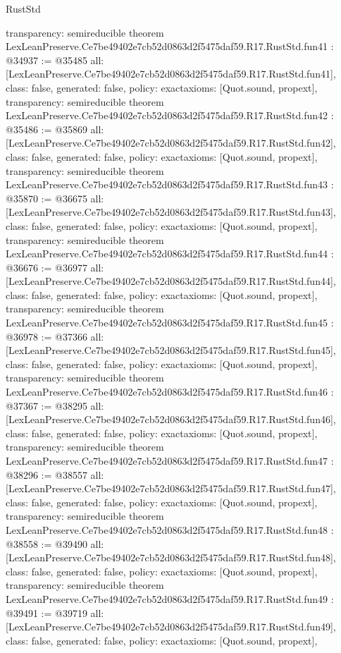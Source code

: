 \begin{lexlean}{RustStd}
\begin{coremodule}
{  transparency: semireducible
}
theorem LexLeanPreserve.Ce7be49402e7cb52d0863d2f5475daf59.R17.RustStd.fun41 : @34937 := @35485 {
  all: [LexLeanPreserve.Ce7be49402e7cb52d0863d2f5475daf59.R17.RustStd.fun41],
  class: false,
  generated: false,
  policy: exact{axioms: [Quot.sound, propext]},
  transparency: semireducible
}
theorem LexLeanPreserve.Ce7be49402e7cb52d0863d2f5475daf59.R17.RustStd.fun42 : @35486 := @35869 {
  all: [LexLeanPreserve.Ce7be49402e7cb52d0863d2f5475daf59.R17.RustStd.fun42],
  class: false,
  generated: false,
  policy: exact{axioms: [Quot.sound, propext]},
  transparency: semireducible
}
theorem LexLeanPreserve.Ce7be49402e7cb52d0863d2f5475daf59.R17.RustStd.fun43 : @35870 := @36675 {
  all: [LexLeanPreserve.Ce7be49402e7cb52d0863d2f5475daf59.R17.RustStd.fun43],
  class: false,
  generated: false,
  policy: exact{axioms: [Quot.sound, propext]},
  transparency: semireducible
}
theorem LexLeanPreserve.Ce7be49402e7cb52d0863d2f5475daf59.R17.RustStd.fun44 : @36676 := @36977 {
  all: [LexLeanPreserve.Ce7be49402e7cb52d0863d2f5475daf59.R17.RustStd.fun44],
  class: false,
  generated: false,
  policy: exact{axioms: [Quot.sound, propext]},
  transparency: semireducible
}
theorem LexLeanPreserve.Ce7be49402e7cb52d0863d2f5475daf59.R17.RustStd.fun45 : @36978 := @37366 {
  all: [LexLeanPreserve.Ce7be49402e7cb52d0863d2f5475daf59.R17.RustStd.fun45],
  class: false,
  generated: false,
  policy: exact{axioms: [Quot.sound, propext]},
  transparency: semireducible
}
theorem LexLeanPreserve.Ce7be49402e7cb52d0863d2f5475daf59.R17.RustStd.fun46 : @37367 := @38295 {
  all: [LexLeanPreserve.Ce7be49402e7cb52d0863d2f5475daf59.R17.RustStd.fun46],
  class: false,
  generated: false,
  policy: exact{axioms: [Quot.sound, propext]},
  transparency: semireducible
}
theorem LexLeanPreserve.Ce7be49402e7cb52d0863d2f5475daf59.R17.RustStd.fun47 : @38296 := @38557 {
  all: [LexLeanPreserve.Ce7be49402e7cb52d0863d2f5475daf59.R17.RustStd.fun47],
  class: false,
  generated: false,
  policy: exact{axioms: [Quot.sound, propext]},
  transparency: semireducible
}
theorem LexLeanPreserve.Ce7be49402e7cb52d0863d2f5475daf59.R17.RustStd.fun48 : @38558 := @39490 {
  all: [LexLeanPreserve.Ce7be49402e7cb52d0863d2f5475daf59.R17.RustStd.fun48],
  class: false,
  generated: false,
  policy: exact{axioms: [Quot.sound, propext]},
  transparency: semireducible
}
theorem LexLeanPreserve.Ce7be49402e7cb52d0863d2f5475daf59.R17.RustStd.fun49 : @39491 := @39719 {
  all: [LexLeanPreserve.Ce7be49402e7cb52d0863d2f5475daf59.R17.RustStd.fun49],
  class: false,
  generated: false,
  policy: exact{axioms: [Quot.sound, propext]},
}
\end{coremodule}
\end{lexlean}
